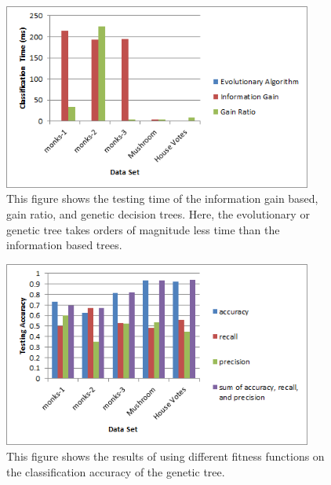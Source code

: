 \documentclass[12pt, letterpaper]{article}
\begin{document}
\begin{figure}[!htb]
\begin{center}
\includegraphics[width=4in]{images/algorithm_comparison_testing_time.png}
\end{center}
\caption{This figure shows the testing time of the information gain
based, gain ratio, and genetic decision trees.  Here, the evolutionary or 
genetic tree takes orders of magnitude less time than the information based
trees.}
\label{Testing Times of Multiple Decision Trees}
\end{figure}


\begin{figure}[!htb]
\begin{center}
\includegraphics[width=4in]{images/fitness_comparison.png}
\end{center}
\caption{This figure shows the results of using different fitness functions on
the classification accuracy of the genetic tree.}
\label{Classification Accuracies Using Various Fitness Functions}
\end{figure}
\end{document}
